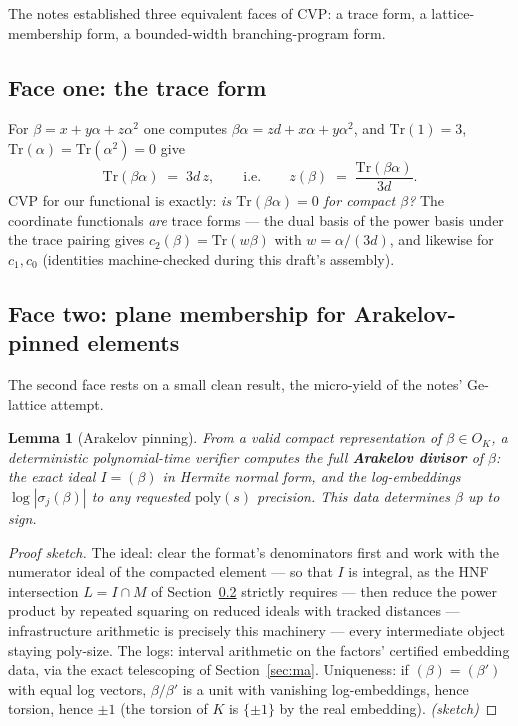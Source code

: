 \documentclass[11pt]{amsart}
\theoremstyle{plain}
\newtheorem{lemma}{Lemma}[section]
\theoremstyle{remark}
\begin{document}
The notes established three equivalent faces of CVP: a trace form, a
lattice-membership form, a bounded-width branching-program form.

\subsection{Face one: the trace form}\label{sec:traceface}

For $\beta = x + y\alpha + z\alpha^2$ one computes $\beta\alpha =
zd + x\alpha + y\alpha^2$, and $\mathrm{Tr}(1) = 3$,
$\mathrm{Tr}(\alpha) = \mathrm{Tr}(\alpha^2) = 0$ give
\[
\mathrm{Tr}(\beta\alpha) \;=\; 3d\,z, \qquad\text{i.e.}\qquad
z(\beta) \;=\; \frac{\mathrm{Tr}(\beta\alpha)}{3d}.
\]
CVP for our functional is exactly: \emph{is $\mathrm{Tr}(\beta\alpha)
= 0$ for compact $\beta$?} The coordinate functionals \emph{are}
trace forms --- the dual basis of the power basis under the trace
pairing gives $c_2(\beta) = \mathrm{Tr}(w\beta)$ with
$w = \alpha/(3d)$, and likewise for $c_1, c_0$ (identities
machine-checked during this draft's assembly).

\subsection{Face two: plane membership for Arakelov-pinned elements}
\label{sec:planeface}

The second face rests on a small clean result, the micro-yield of the
notes' Ge-lattice attempt.

\setcounter{lemma}{2}%
\begin{lemma}[Arakelov pinning]\label{lem:pinning}
From a valid compact representation of $\beta \in O_K$, a
deterministic polynomial-time verifier computes the full
\textbf{Arakelov divisor} of $\beta$: the exact ideal $I = (\beta)$
in Hermite normal form, and the log-embeddings
$\log|\sigma_j(\beta)|$ to any requested $\mathrm{poly}(s)$
precision. This data determines $\beta$ up to sign.
\end{lemma}

\begin{proof}[Proof sketch]
The ideal: clear the format's denominators first and work with the
numerator ideal of the compacted element --- so that $I$ is integral,
as the HNF intersection $L = I \cap M$ of
Section~\ref{sec:planeface} strictly requires --- then reduce the
power product by repeated squaring on reduced ideals with tracked
distances --- infrastructure arithmetic is precisely this machinery
\cite{BW88,Sch08} --- every intermediate object staying
$\mathrm{poly}$-size. The logs: interval arithmetic on the factors'
certified embedding data, via the exact telescoping of
Section~\ref{sec:ma}. Uniqueness: if $(\beta) = (\beta')$ with equal
log vectors, $\beta/\beta'$ is a unit with vanishing log-embeddings,
hence torsion, hence $\pm 1$ (the torsion of $K$ is $\{\pm 1\}$ by
the real embedding). \emph{(sketch)}
\end{proof}
\end{document}
